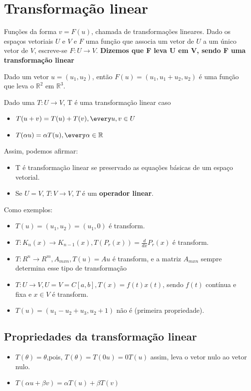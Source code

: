 \documentclass[letterpaper, 11pt]{article}
\begin{document}
\section{Transformação linear}
\label{sec:org4e4b6db}
Funções da forma \(v=F(u)\), chamada de transformações lineares. Dado os espaços vetoriais \(U\) e \(V\) e \(F\) uma função que associa um vetor de \(U\) a um único vetor de \(V\), escreve-se \(F : U \to V\).
\textbf{Dizemos que F leva U em V, sendo F uma transformação linear}

Dado um vetor \(u=(u_1,u_2)\), então \(F(u) = (u_1, u_1 + u_2, u_2)\) é uma função que leva o \(\mathbb{R}^2\) em \(\mathbb{R}^3\).

Dado uma \(T: U \to V\), T é uma transformação linear caso
\begin{itemize}
\item \(T(u+v) = T(u) + T(v), \every u, v \in U\)
\item \(T(\alpha u) = \alpha T(u), \every \alpha \in \mathbb{R}\)
\end{itemize}

Assim, podemos afirmar:
\begin{itemize}
\item T é transformação linear se preservado as equações básicas de um espaço vetorial.
\item Se \(U=V\), \(T: V \to V\), \(T\) é um \textbf{operador linear}.
\end{itemize}

Como exemplos:
\begin{itemize}
\item \(T(u) = (u_1,u_2) = (u_1,0)\) é transform.
\item \(T : K_n(x) \to K_{n-1}(x), T(P_r(x)) = \frac{d}{dx} P_r(x)\) é transform.
\item \(T: R^n \to R^m, A_{mxn}, T(u) = Au\) é transform, e a matriz \(A_{mxn}\) sempre determina esse tipo de transformação
\item \(T:U \to V, U=V=C[a,b],T(x) = f(t)x(t)\), sendo \(f(t)\) contínua e fixa e \(x \in V\) é transform.
\item \(T(u) = (u_1-u_2 + u_3, u_2+1)\) não é (primeira propriedade).
\end{itemize}

\subsection{Propriedades da transformação linear}
\label{sec:org11ae21e}
\begin{itemize}
\item \(T(\theta) = \theta\),pois, \(T(\theta) = T(0u) = 0T(u)\) assim, leva o vetor nulo ao vetor nulo.
\item \(T(\alpha u + \beta v) = \alpha T(u) + \beta T(v)\)
\end{itemize}
\end{document}
